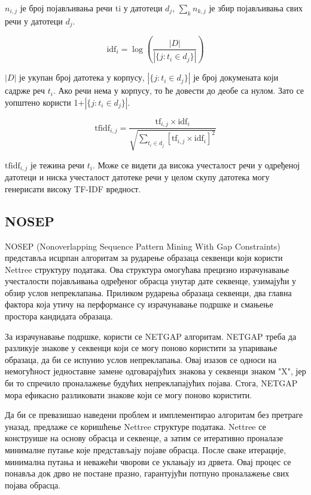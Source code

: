 \documentclass[12pt]{article}
\begin{document}
$n_{i,j}$  је број појављивања речи ti у датотеци $d_{j}$,
$\sum_{k} n_{k,j}$ је збир појављивања свих речи у датотеци
$d_{j}$.

$$\mathrm{idf}_i = \log \left(\frac{|D|}{|\{j : t_i \in d_j\}|}\right) $$

$|D|$ је укупан број датотека у корпусу, $|\{j : t_i \in d_j\}|$
је број докумената који садрже реч $t_{i}$. Ако
речи нема у корпусу, то ће довести до деобе са нулом. Зато се
уопштено користи 1+$|\{j : t_i \in d_j\}|$.

$$\mathrm{tfidf}_{i,j} = \frac{\mathrm{tf}_{i,j} \times \mathrm{idf}_{i}}{\sqrt{\sum_{t_i \in d_j} \left[\mathrm{tf}_{i,j} \times \mathrm{idf}_i\right]^2}}$$


$\mathrm{tfidf}_{i,j}$ је тежина речи ${t}_{i}$. Може се видети да висока
учесталост речи у одређеној датотеци и ниска учесталост датотеке
речи у целом скупу датотека могу генерисати високу TF-IDF вредност. 

\subsection{NOSEP}

NOSEP\cite{8053457} (Nonoverlapping Sequence Pattern Mining With Gap Constraints) представља исцрпан алгоритам за рударење образаца секвенци који користи Nettree структуру података. Ова структура омогућава прецизно израчунавање учесталости појављивања одређеног обрасца унутар дате секвенце, узимајући у обзир услов непреклапања. Приликом рударења образаца секвенци, два главна фактора која утичу на перформансе су израчунавање подршке и смањење простора кандидата образаца. 

За израчунавање подршке, користи се NETGAP алгоритам. NETGAP треба да  разликује знакове у секвенци који се могу поново користити за упаривање образаца, да би се испунио услов непреклапања. Овај изазов се односи на немогућност једноставне замене одговарајућих знакова у секвенци знаком "X", јер би то спречило проналажење будућих непреклапајућих појава. Стога, NETGAP мора ефикасно разликовати знакове који се могу поново користити.

Да би се превазишао наведени проблем и имплементирао алгоритам без претраге уназад, предлаже се коришћење Nettree структуре података. Nettree се конструише на основу обрасца и секвенце, а затим се итеративно проналазе минималне путање које представљају појаве обрасца. После сваке итерације, минимална путања и неважећи чворови се уклањају из дрвета. Овај процес се понавља док дрво не постане празно, гарантујући потпуно проналажење свих појава обрасца.
\end{document}
